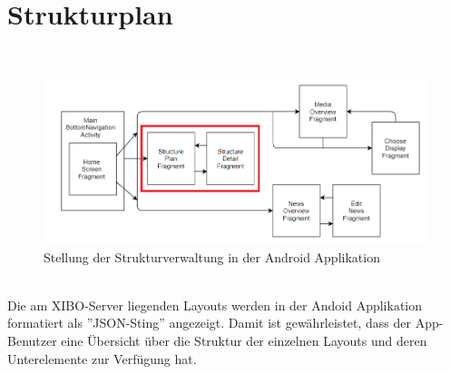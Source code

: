 \section{Strukturplan}
\\
\begin{figure}[H]
\centering
\includegraphics[width=1.0\textwidth]{images/06_AndroidApp/06_AndroidArchStructureCrawler}
\caption{Stellung der Strukturverwaltung in der Android Applikation}
\label{fig:mediaNav}
\end{figure}
\\	
Die am XIBO-Server liegenden Layouts werden in der Andoid Applikation formatiert als ''JSON-Sting'' angezeigt. Damit ist gewährleistet, dass der App-Benutzer eine Übersicht über die Struktur der einzelnen Layouts und deren Unterelemente zur Verfügung hat.
